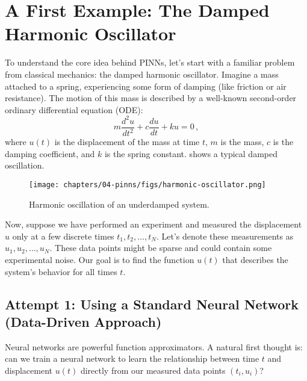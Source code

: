 \section{A First Example: The Damped Harmonic Oscillator}
\label{sec:oscillator_intro}

To understand the core idea behind PINNs, let's start with a familiar problem from classical mechanics: the damped harmonic oscillator. Imagine a mass attached to a spring, experiencing some form of damping (like friction or air resistance). The motion of this mass is described by a well-known second-order ordinary differential equation (ODE):
%
\begin{equation}
m\frac{d^2u}{dt^2} + c\frac{du}{dt} + ku = 0 \,,
\label{eq:oscillator_ode}
\end{equation}
%
where $u(t)$ is the displacement of the mass at time $t$, $m$ is the mass, $c$ is the damping coefficient, and $k$ is the spring constant.  shows a typical damped oscillation.

\begin{figure}[htbp] %
    \centering
    \texttt{[image: chapters/04-pinns/figs/harmonic-oscillator.png]}
    \caption{Harmonic oscillation of an underdamped system.}
    \label{fig:harmonic_oscillator} %
\end{figure}

Now, suppose we have performed an experiment and measured the displacement $u$ only at a few discrete times $t_1, t_2, \ldots, t_N$. Let's denote these measurements as $u_1, u_2, \ldots, u_N$. These data points might be sparse and could contain some experimental noise. Our goal is to find the function $u(t)$ that describes the system's behavior for all times $t$.


\subsection{Attempt 1: Using a Standard Neural Network (Data-Driven Approach)}

Neural networks are powerful function approximators. A natural first thought is: can we train a neural network to learn the relationship between time $t$ and displacement $u(t)$ directly from our measured data points $(t_i, u_i)$?


